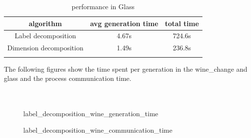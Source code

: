 \documentclass[conference,compsoc]{IEEEtran}
\begin{document}
\begin{table}[H]
	\centering
\begin{tabular}{ccc}
\hline
algorithm& avg generation time& total time\\
\hline
Label decomposition& 4.67s& 724.6s\\
Dimension decomposition& 1.49s& 236.8s\\
\hline
\\
\end{tabular}
\caption{performance in Glass}
\end{table}
The following figures show the time spent per generation in the wine\_change and glass and the process communication time.
\\\\\

\begin{figure}[htbp]%
	\centering
	\caption{label\_decomposition\_wine\_generation\_time}
\end{figure}

\begin{figure}[htbp]%
	\centering
	\caption{label\_decomposition\_wine\_communication\_time}
\end{figure}
\end{document}
